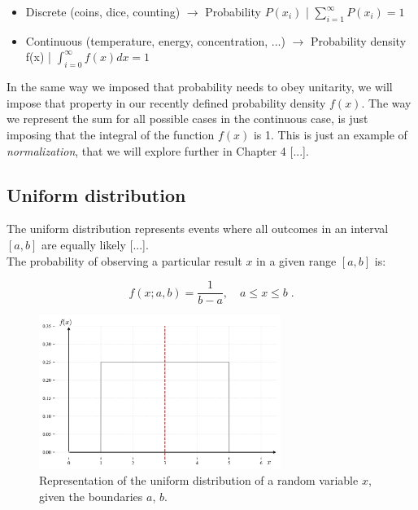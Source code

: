 \documentclass{book}
\begin{document}
\begin{itemize}
\item Discrete (coins, dice, counting) $\longrightarrow$ Probability $P(x_{i})$ | $\sum_{i = 1}^{\infty} P(x_{i}) = 1$
\item Continuous (temperature, energy, concentration, ...) $\longrightarrow$ Probability density f(x) | $\int_{i = 0}^{\infty} f(x) dx = 1$
\end{itemize}

In the same way we imposed that probability needs to obey unitarity, we will impose that property in our recently defined probability density $f(x)$. The way we represent the sum for all possible cases in the continuous case, is just imposing that the integral of the function $f(x)$ is 1. This is just an example of \textit{normalization}, that we will explore further in Chapter 4 [...].

\subsection{Uniform distribution}

The uniform distribution represents events where all outcomes in an interval $[a, b]$ are equally likely [...].\\

The probability of observing a particular result $x$ in a given range $[a, b]$ is:

\begin{equation}
    f(x; a, b) = \frac{1}{b-a}, \quad a \leq x \leq b \; .
\end{equation}

\begin{figure}[ht]
    \centering
    \includegraphics[width=0.7\textwidth]{figures/chapter2/uniform_1.png}
    \caption{Representation of the uniform distribution of a random variable $x$, given the boundaries $a$, $b$.}
    \label{fig:uniform1}
\end{figure}
\end{document}
